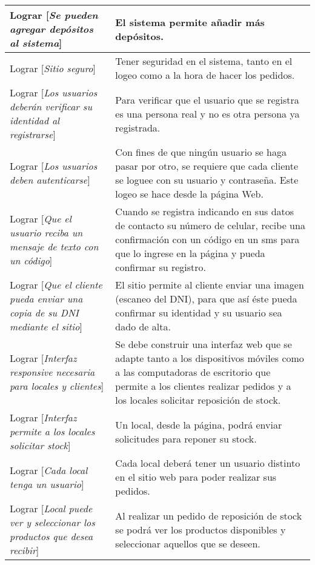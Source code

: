 \begin{center}
\begin{longtable}{p{7cm} p{7cm}}
Lograr [\textit{Se pueden agregar depósitos al sistema}] & El sistema permite añadir más depósitos. \\[0.2em] \hline

Lograr [\textit{Sitio seguro}] & Tener seguridad en el sistema, tanto en el logeo como a la hora de hacer los pedidos. \\[0.2em] \hline

Lograr [\textit{Los usuarios deberán verificar su identidad al registrarse}] & Para verificar que el usuario que se registra es una persona real y no es otra persona ya registrada. \\[0.2em] \hline

Lograr [\textit{Los usuarios deben autenticarse}] & Con fines de que ningún usuario se haga pasar por otro, se requiere que cada cliente se loguee con su usuario y contraseña. Este logeo se hace desde la página Web. \\[0.2em] \hline

Lograr [\textit{Que el usuario reciba un mensaje de texto con un código}] & Cuando se registra indicando en sus datos de contacto su número de celular, recibe una confirmación con un código en un sms para que lo ingrese en la página y pueda confirmar su registro. \\[0.2em] \hline

Lograr [\textit{Que el cliente pueda enviar una copia de su DNI mediante el sitio}] & El sitio permite al cliente enviar una imagen (escaneo del DNI), para que así éste pueda confirmar su identidad y su usuario sea dado de alta. \\[0.2em] \hline

Lograr [\textit{Interfaz responsive necesaria para locales y clientes}] & Se debe construir una interfaz web que se adapte tanto a los dispositivos móviles como a las computadoras de escritorio que permite a los clientes realizar pedidos y a los locales solicitar reposición de stock. \\[0.2em] \hline

Lograr [\textit{Interfaz permite a los locales solicitar stock}] & Un local, desde la página, podrá enviar solicitudes para reponer su stock. \\[0.2em] \hline

Lograr [\textit{Cada local tenga un usuario}] & Cada local deberá tener un usuario distinto en el sitio web para poder realizar sus pedidos. \\[0.2em] \hline

Lograr [\textit{Local puede ver y seleccionar los productos que desea recibir}] & Al realizar un pedido de reposición de stock se podrá ver los productos disponibles y seleccionar aquellos que se deseen. \\[0.2em] \hline


\end{longtable}
\end{center}
